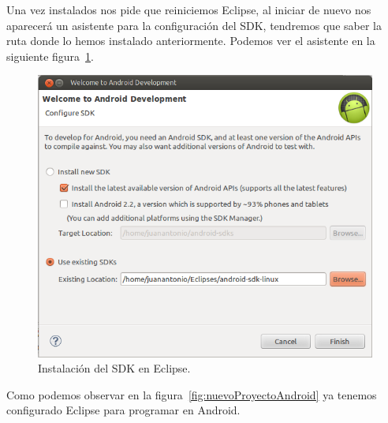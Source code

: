 Una vez instalados nos pide que reiniciemos Eclipse, al iniciar de nuevo nos aparecerá un asistente para la configuración del SDK, tendremos que saber la ruta donde lo hemos instalado anteriormente. Podemos ver el asistente en la siguiente figura~\ref{fig:configuracionSDK}.
 
\begin{figure}
  \centering
    \includegraphics[scale=0.6]{./AnexoConfiguracionEclipse/imagenes/configuracionSDK.png}
  \caption{Instalación del SDK en Eclipse.}
  \label{fig:configuracionSDK}
\end{figure}

Como podemos observar en la figura~\ref{fig:nuevoProyectoAndroid} ya tenemos configurado Eclipse para programar en Android.

